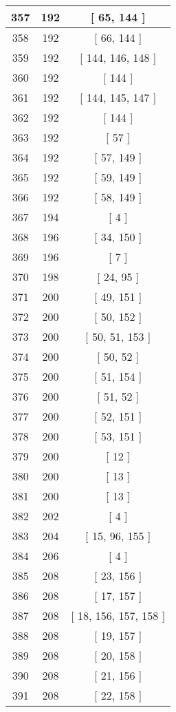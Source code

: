 \begin{center}
\begin{longtable}[H]{|| c c c ||}
\hline
357 & 192 & [ 65, 144 ] \\ 
\hline
358 & 192 & [ 66, 144 ] \\ 
\hline
359 & 192 & [ 144, 146, 148 ] \\ 
\hline
360 & 192 & [ 144 ] \\ 
\hline
361 & 192 & [ 144, 145, 147 ] \\ 
\hline
362 & 192 & [ 144 ] \\ 
\hline
363 & 192 & [ 57 ] \\ 
\hline
364 & 192 & [ 57, 149 ] \\ 
\hline
365 & 192 & [ 59, 149 ] \\ 
\hline
366 & 192 & [ 58, 149 ] \\ 
\hline
367 & 194 & [ 4 ] \\ 
\hline
368 & 196 & [ 34, 150 ] \\ 
\hline
369 & 196 & [ 7 ] \\ 
\hline
370 & 198 & [ 24, 95 ] \\ 
\hline
371 & 200 & [ 49, 151 ] \\ 
\hline
372 & 200 & [ 50, 152 ] \\ 
\hline
373 & 200 & [ 50, 51, 153 ] \\ 
\hline
374 & 200 & [ 50, 52 ] \\ 
\hline
375 & 200 & [ 51, 154 ] \\ 
\hline
376 & 200 & [ 51, 52 ] \\ 
\hline
377 & 200 & [ 52, 151 ] \\ 
\hline
378 & 200 & [ 53, 151 ] \\ 
\hline
379 & 200 & [ 12 ] \\ 
\hline
380 & 200 & [ 13 ] \\ 
\hline
381 & 200 & [ 13 ] \\ 
\hline
382 & 202 & [ 4 ] \\ 
\hline
383 & 204 & [ 15, 96, 155 ] \\ 
\hline
384 & 206 & [ 4 ] \\ 
\hline
385 & 208 & [ 23, 156 ] \\ 
\hline
386 & 208 & [ 17, 157 ] \\ 
\hline
387 & 208 & [ 18, 156, 157, 158 ] \\ 
\hline
388 & 208 & [ 19, 157 ] \\ 
\hline
389 & 208 & [ 20, 158 ] \\ 
\hline
390 & 208 & [ 21, 156 ] \\ 
\hline
391 & 208 & [ 22, 158 ] \\ 

\end{longtable}
\end{center}
